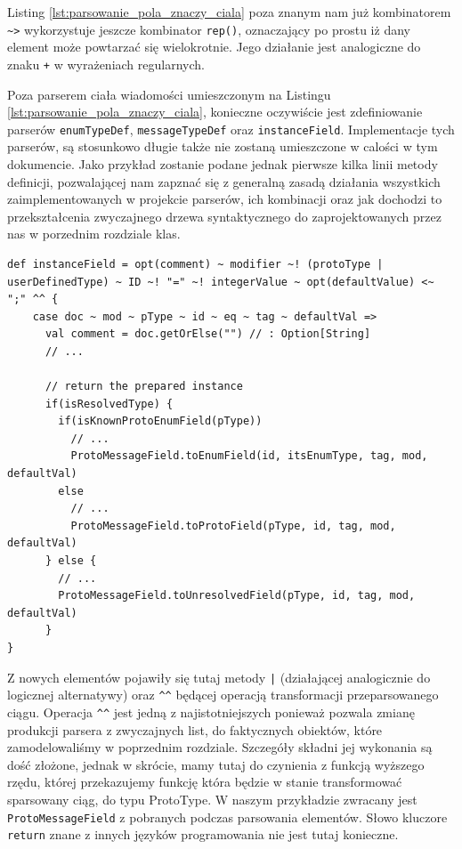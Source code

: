 \documentclass[pdflatex,11pt]{aghdpl}
\begin{document}
Listing \ref{lst:parsowanie_pola_znaczy_ciala} poza znanym nam już kombinatorem \verb|~>| wykorzystuje jeszcze kombinator \verb|rep()|,
oznaczający po prostu iż dany element może powtarzać się wielokrotnie. Jego działanie jest analogiczne do znaku \verb|+| w wyrażeniach regularnych.

Poza parserem ciała wiadomości umieszczonym na Listingu \ref{lst:parsowanie_pola_znaczy_ciala}, konieczne oczywiście jest zdefiniowanie parserów \verb|enumTypeDef|,
\verb|messageTypeDef| oraz \verb|instanceField|. Implementacje tych parserów, są stosunkowo długie także nie zostaną umieszczone w calości w tym dokumencie. Jako
przykład zostanie podane jednak pierwsze kilka linii metody definicji, pozwalającej nam zapznać się z generalną zasadą działania wszystkich zaimplementowanych w 
projekcie parserów, ich kombinacji oraz jak dochodzi to przekształcenia zwyczajnego drzewa syntaktycznego do zaprojektowanych przez nas w porzednim rozdziale klas.

\begin{lstlisting}[caption={Skrócona implementacja parsera pola wiadomości}, label={lst:short_field_parser}]
def instanceField = opt(comment) ~ modifier ~! (protoType | userDefinedType) ~ ID ~! "=" ~! integerValue ~ opt(defaultValue) <~ ";" ^^ {
    case doc ~ mod ~ pType ~ id ~ eq ~ tag ~ defaultVal =>
      val comment = doc.getOrElse("") // : Option[String]
      // ...

      // return the prepared instance
      if(isResolvedType) {
        if(isKnownProtoEnumField(pType))
          // ... 
          ProtoMessageField.toEnumField(id, itsEnumType, tag, mod, defaultVal)
        else 
          // ...
          ProtoMessageField.toProtoField(pType, id, tag, mod, defaultVal)
      } else {
        // ...
        ProtoMessageField.toUnresolvedField(pType, id, tag, mod, defaultVal)
      }
}
\end{lstlisting}

Z nowych elementów pojawiły się tutaj metody \verb/|/ (działającej analogicznie do logicznej alternatywy) oraz \verb|^^| będącej operacją transformacji 
przeparsowanego ciągu. Operacja \verb|^^| jest jedną z najistotniejszych ponieważ pozwala zmianę produkcji parsera z 
zwyczajnych list, do faktycznych obiektów, które zamodelowaliśmy w poprzednim rozdziale. Szczegóły składni jej wykonania są dość złożone, jednak w skrócie, 
mamy tutaj do czynienia z funkcją wyższego rzędu, której przekazujemy funkcję która będzie w stanie transformować sparsowany ciąg, do typu ProtoType.
W naszym przykładzie zwracany jest \verb|ProtoMessageField| z pobranych podczas parsowania elementów. Słowo kluczore \verb|return| znane z innych języków programowania
nie jest tutaj konieczne.
\end{document}
